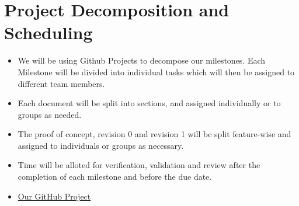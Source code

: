 \documentclass{article}
\begin{document}
\section{Project Decomposition and Scheduling}

\begin{itemize}
  \item We will be using Github Projects to decompose our milestones.
    Each Milestone will be divided into
    individual tasks which will then be assigned to different team members.
  \item Each document will be split into sections, and assigned
    individually or to groups as needed.
  \item The proof of concept, revision 0 and revision 1 will be split
    feature-wise and assigned to individuals or
    groups as necessary.
  \item Time will be alloted for verification, validation and review
    after the completion of each milestone and
    before the due date.
  \item
    \href{https://github.com/users/Spitgranger/projects/2/views/1}{Our
    GitHub Project}
\end{itemize}
\newpage
\end{document}

